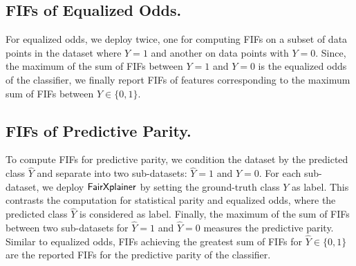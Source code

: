 \subsection{FIFs of Equalized Odds.}  For equalized odds, we deploy {\fairXplainer} twice, one for computing FIFs on a subset of data points in the dataset where $ Y = 1 $ and another on data points with $ Y = 0 $. Since, the maximum of the sum of FIFs between $ Y = 1 $ and $ Y = 0 $ is the equalized odds of the classifier, we finally report FIFs of features corresponding to the maximum sum of FIFs between $ Y \in \{0, 1\} $.





\subsection{FIFs of Predictive Parity.}  To compute FIFs for predictive parity, we condition the dataset by the predicted class $ \widehat{Y} $ and separate into two sub-datasets: $ \widehat{Y} = 1 $ and  $ \widehat{Y} = 0 $. For each sub-dataset, we deploy $ \mathsf{FairXplainer} $ by setting the ground-truth class $ Y $ as label. This contrasts the computation for  statistical parity and equalized odds, where the predicted class $ \widehat{Y} $ is considered as label. Finally, the maximum of the sum of FIFs between two sub-datasets for $ \widehat{Y} = 1 $ and  $ \widehat{Y} = 0 $ measures the predictive parity. Similar to equalized odds, FIFs achieving the greatest sum of FIFs for $ \widehat{Y} \in \{0, 1\} $ are the reported FIFs for the predictive parity of the classifier.



